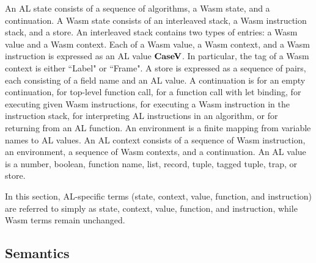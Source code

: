 An AL state consists of a sequence of algorithms, a Wasm state, and a
continuation.
A Wasm state consists of an interleaved stack, a Wasm instruction stack, and a
store.
An interleaved stack contains two types of entries: a Wasm value and a Wasm
context.
Each of a Wasm value, a Wasm context, and a Wasm instruction is expressed as an
AL value $\textbf{CaseV}$.
In particular, the tag of a Wasm context is either ``Label" or ``Frame".
A store is expressed as a sequence of pairs, each consisting of a field name
and an AL value.
A continuation is \mt{} for an empty continuation, \toplevelcall{} for
top-level function call, \call{} for a function call with let binding, \exe{}
for executing given Wasm instructions, \wasm{} for executing a Wasm instruction
in the instruction stack, \algo{} for interpreting AL instructions in an
algorithm, or \ret{} for returning from an AL function.
An environment is a finite mapping from variable names to AL values.
An AL context consists of a sequence of Wasm instruction, an environment, a
sequence of Wasm contexts, and a continuation.
An AL value is a number, boolean, function name, list, record, tuple, tagged tuple,
trap, or store.


In this section, AL-specific terms (state, context, value, function, and
instruction) are referred to simply as state, context, value, function, and
instruction, while Wasm terms remain unchanged.




\newpage
\subsection{Semantics}
\label{semantics}


